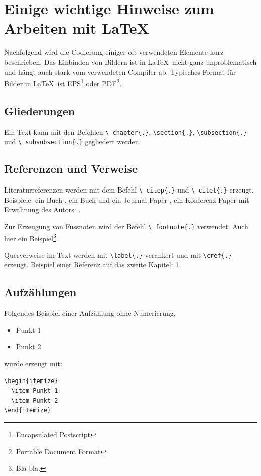 \chapter{Einige wichtige Hinweise zum Arbeiten mit \LaTeX\ }
\label{sec:latexumg}

Nachfolgend wird die Codierung einiger oft verwendeten Elemente
kurz beschrieben. Das Einbinden von Bildern ist in \LaTeX\ nicht
ganz unproblematisch und hängt auch stark vom verwendeten Compiler
ab. Typisches Format für Bilder in \LaTeX\ ist
EPS\footnote{Encapsulated Postscript} oder PDF\footnote{Portable Document Format}.


\section{Gliederungen}
\label{sec:gliederung}

Ein Text kann mit den Befehlen \texttt{\textbackslash
chapter\{.\}}, \texttt{\textbackslash section\{.\}},
\texttt{\textbackslash subsection\{.\}} und \texttt{\textbackslash
subsubsection\{.\}} gegliedert werden.


\section{Referenzen und Verweise}
\label{sec:refverw}

Literaturreferenzen werden mit dem Befehl \texttt{\textbackslash
citep\{.\}} und \texttt{\textbackslash
citet\{.\}} erzeugt. Beispiele: ein Buch \citep{Raibert1986LeggedRobotsThatBalance}, ein Buch und ein Journal Paper \citep{Raibert1986LeggedRobotsThatBalance,Vukobratovic2004ZeroMomentPoint}, ein Konferenz Paper mit Erwähnung des Autors: \citet{Pratt1995SEA}.

Zur Erzeugung von Fussnoten wird der Befehl \texttt{\textbackslash
footnote\{.\}} verwendet. Auch hier ein Beispiel\footnote{Bla
bla.}.

Querverweise im Text werden mit \texttt{\textbackslash label\{.\}}
verankert und mit \texttt{\textbackslash cref\{.\}} erzeugt.
Beispiel einer Referenz auf das zweite Kapitel:
\cref{sec:latexumg}.


\section{Aufzählungen}\label{sec:aufz}

Folgendes Beispiel einer Aufzählung ohne Numerierung,
\begin{itemize}
  \item Punkt 1
  \item Punkt 2
\end{itemize}
wurde erzeugt mit:
\begin{verbatim}
\begin{itemize}
  \item Punkt 1
  \item Punkt 2
\end{itemize}
\end{verbatim}

